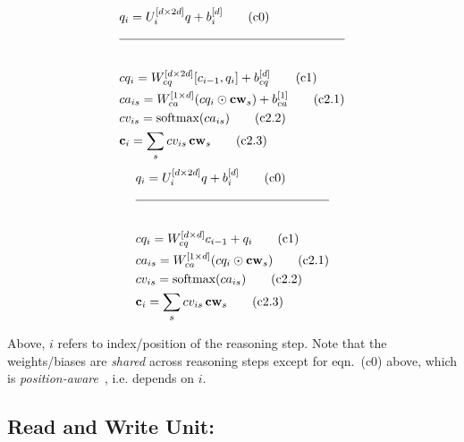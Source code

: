 \begin{multicols}{2}
	\noindent
	\begin{align*}
	&q_i = U_i^{[d \times 2d]} q + b_i^{[d]}  \tag{c0} \\
	\cline{1-2} \\[2pt]
	&cq_i = W_{\cq}^{[d \times 2d]} [c_{i-1}, q_i] + b_{\cq}^{[d]}  \tag{c1} \\
	&ca_{is} = W_{\ca}^{[1 \times d]} (cq_i \odot \cw_s) + b_{\ca}^{[1]}
	\tag{c2.1}\\
	&cv_{is} = \textrm{softmax}(ca_{is}) \tag{c2.2}\\
	&\cc_i = \sum_s cv_{is} \, \cw_s  \tag{c2.3}
	\end{align*} 
	\columnbreak
	\begin{align*}
	&q_i = U_i^{[d \times 2d]} q + b_i^{[d]}  \tag{c0} \\
	\cline{1-2} \\[2pt]
	&cq_i = W_{\cq}^{[d \times d]} c_{i-1} + q_i  \tag{c1} \\
	&ca_{is} = W_{\ca}^{[1 \times d]} (cq_i \odot \cw_s)  \tag{c2.1}\\
	&cv_{is} = \textrm{softmax}(ca_{is}) \tag{c2.2}\\
	&\cc_i = \sum_s cv_{is} \, \cw_s  \tag{c2.3}
    \end{align*} 
\end{multicols}

Above, $i$ refers to index/position of the reasoning step. Note that the weights/biases
are \emph{shared} across reasoning steps except for eqn.~(c0) above, which 
is \emph{position-aware}~\cite{hudsonManning18}, i.e. depends
on $i$.

\subsection*{Read and Write Unit:}
\newcommand{\kb}{\mathbf{k}}
\newcommand{\tkb}{\mathbf{\hat{k}}}
\newcommand{\mi}{\textsf{I}}
\newcommand{\mpi}{\textsf{I'}}
\newcommand{\mem}{\mathbf{m}}
\newcommand{\rr}{\mathbf{r}}

